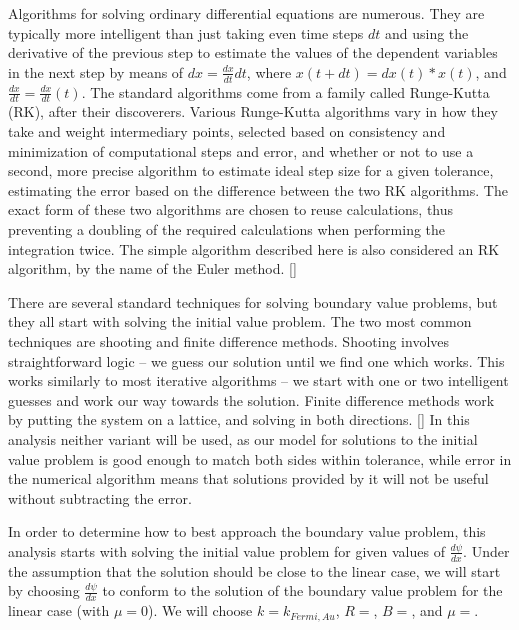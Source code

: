 \documentclass[A4,12pt,oneside]{article}
\renewcommand{\(}{\left(}
\renewcommand{\)}{\right)}
\begin{document}
Algorithms for solving ordinary differential equations are numerous. They are typically more intelligent than just taking even time steps $dt$ and using the derivative of the previous step to estimate the values of the dependent variables in the next step by means of $dx = \frac{dx}{dt}dt$, where $x\left(t + dt\right) = dx\left(t\right) * x\left(t\right)$, and $\frac{dx}{dt} = \frac{dx}{dt} \left(t\right)$. 
The standard algorithms come from a family called Runge-Kutta (RK), after their discoverers. Various Runge-Kutta algorithms vary in how they take and weight intermediary points, selected based on consistency and minimization of computational steps and error, and whether or not to use a second, more precise algorithm to estimate ideal step size for a given tolerance, estimating the error based on the difference between the two RK algorithms. The exact form of these two algorithms are chosen to reuse calculations, thus preventing a doubling of the required calculations when performing the integration twice. The simple algorithm described here is also considered an RK algorithm, by the name of the Euler method. [] 

There are several standard techniques for solving boundary value problems, but they all start with solving the initial value problem. The two most common techniques are shooting and finite difference methods. Shooting involves straightforward logic -- we guess our solution until we find one which works. This works similarly to most iterative algorithms -- we start with one or two intelligent guesses and work our way towards the solution. Finite difference methods work by putting the system on a lattice, and solving in both directions. [] In this analysis neither variant will be used, as our model for solutions to the initial value problem is good enough to match both sides within tolerance, while error in the numerical algorithm means that solutions provided by it will not be useful without subtracting the error. 

In order to determine how to best approach the boundary value problem, this analysis starts with solving the initial value problem for given values of $\frac{d\psi}{dx}$. Under the assumption that the solution should be close to the linear case, we will start by choosing $\frac{d\psi}{dx}$ to conform to the solution of the boundary value problem for the linear case (with $\mu = 0$). We will choose $k = k_{Fermi, Au}$, $R = $, $B = $, and $\mu = $. 
\end{document}
